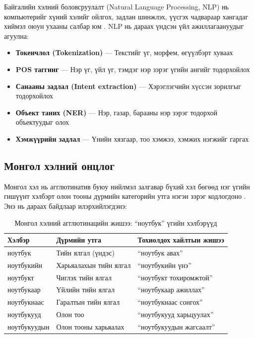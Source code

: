 \documentclass[12pt,a4paper]{report}
\begin{document}
Байгалийн хэлний боловсруулалт (Natural Language Processing, NLP) нь компьютерийг хүний хэлийг ойлгох, задлан шинжлэх, үүсгэх чадвараар хангадаг хиймэл оюун ухааны салбар юм \cite{jurafsky2019}. NLP нь дараах үндсэн үйл ажиллагаануудыг агуулна:

\begin{itemize}[leftmargin=1.5cm]
  \item \textbf{Токенчлол (Tokenization)} --- Текстийг үг, морфем, өгүүлбэрт хуваах
  \item \textbf{POS таггинг} --- Нэр үг, үйл үг, тэмдэг нэр зэрэг үгийн ангийг тодорхойлох
  \item \textbf{Санааны задлал (Intent extraction)} --- Хэрэглэгчийн хүссэн зорилгыг тодорхойлох
  \item \textbf{Объект таних (NER)} --- Нэр, газар, барааны нэр зэрэг тодорхой объектуудыг олох
  \item \textbf{Хэмжүүрийн задлал} --- Үнийн хязгаар, тоо хэмжээ, хэмжих нэгжийг гаргах
\end{itemize}

\subsection{Монгол хэлний онцлог}

Монгол хэл нь агглютинатив буюу нийлмэл залгавар бүхий хэл бөгөөд нэг үгийн гишүүнт хэлбэрт олон тооны дүрмийн категорийн утга нэгэн зэрэг кодлогдоно \cite{jurafsky2019}. Энэ нь дараах байдлаар илэрхийлэгдэнэ:

\begin{table}[H]
\centering
\caption{Монгол хэлний агглютинацийн жишээ: ``ноутбук'' үгийн хэлбэрүүд}
\label{tab:agglutination}
\begin{tabularx}{\textwidth}{@{}lXl@{}}
\toprule
\textbf{Хэлбэр} & \textbf{Дүрмийн утга} & \textbf{Тохиолдох хайлтын жишээ} \\
\midrule
ноутбук & Тийн ялгал (үндэс) & ``ноутбук авах'' \\
ноутбукийн & Харьяалахын тийн ялгал & ``ноутбукийн үнэ'' \\
ноутбукт & Чиглэх тийн ялгал & ``ноутбукт тохиромжтой'' \\
ноутбукаар & Үйлийн тийн ялгал & ``ноутбукаар ажиллах'' \\
ноутбукнаас & Гаралтын тийн ялгал & ``ноутбукнаас сонгох'' \\
ноутбукууд & Олон тоо & ``ноутбукууд харьцуулах'' \\
ноутбукуудын & Олон тооны харьяалах & ``ноутбукуудын жагсаалт'' \\
\bottomrule
\end{tabularx}
\end{table}
\end{document}
